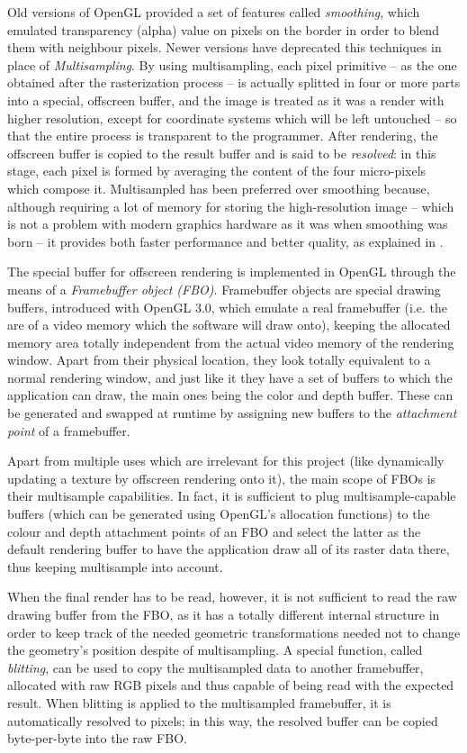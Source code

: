 Old versions of OpenGL provided a set of features called \emph{smoothing}, which
emulated transparency (alpha) value on pixels on the border in order to blend
them with neighbour pixels. Newer versions have deprecated this techniques in
place of \emph{Multisampling}. By using multisampling, each pixel primitive --
as the one obtained after the rasterization process -- is actually splitted in
four or more parts into a special, offscreen buffer, and the image is treated as
it was a render with higher resolution, except for coordinate systems which will
be left untouched -- so that the entire process is transparent to the
programmer. After rendering, the offscreen buffer is copied to the result buffer
and is said to be \emph{resolved}: in this stage, each pixel is formed by
averaging the content of the four micro-pixels which compose it. Multisampled
has been preferred over smoothing because, although requiring a lot of memory
for storing the high-resolution image -- which is not a problem with modern
graphics hardware as it was when smoothing was born --  it provides both faster
performance and better quality, as explained in \cite{opengl-book}.

The special buffer for offscreen rendering is implemented in OpenGL through the
means of a \emph{Framebuffer object (\emph{FBO})}.
Framebuffer objects are special drawing buffers, introduced with OpenGL 3.0,
which emulate a real framebuffer (i.e. the are of a video memory which
the software will draw onto), keeping the allocated memory area totally
independent from the actual video memory of the rendering window. Apart from
their physical location, they look totally equivalent to a normal rendering
window, and just like it they have a set of buffers to which the application can
draw, the main ones being the color and depth buffer. These can be generated and
swapped at runtime by assigning new buffers to the \emph{attachment point} of a
framebuffer.

Apart from multiple uses which are irrelevant for this project (like dynamically
updating a texture by offscreen rendering onto it), the main scope of FBOs is
their multisample capabilities. In fact, it is sufficient to plug
multisample-capable buffers (which can be generated using OpenGL's allocation
functions) to the colour and depth attachment points of an FBO and select the
latter as the default rendering buffer to have the application draw all of its
raster data there, thus keeping multisample into account. 

When the final render has to be read, however, it is not sufficient to read the
raw drawing buffer from the FBO, as it has a totally different internal
structure in order to keep track of the needed geometric transformations needed
not to change the geometry's position despite of multisampling. A special
function, called \emph{blitting}, can be used to copy the multisampled data to
another framebuffer, allocated with raw RGB pixels and thus capable of being
read with the expected result. When blitting is applied to the multisampled
framebuffer, it is automatically resolved to pixels; in this way, the resolved
buffer can be copied byte-per-byte into the raw FBO.

